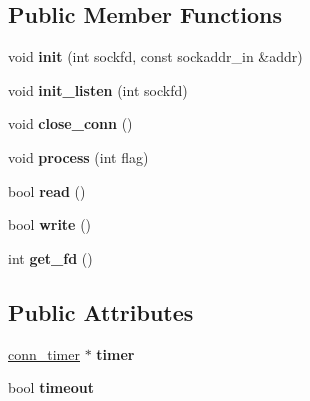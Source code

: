 \subsection*{Public Member Functions}
\begin{DoxyCompactItemize}
\item 
\mbox{\label{classpink__http__conn_abff27697496d209cdc7375f99117f018}} 
void {\bfseries init} (int sockfd, const sockaddr\+\_\+in \&addr)
\item 
\mbox{\label{classpink__http__conn_a14ed30d2643f52ec95c45b11b13b2411}} 
void {\bfseries init\+\_\+listen} (int sockfd)
\item 
\mbox{\label{classpink__http__conn_abdcd7c0da8072d62cb7212523f20298b}} 
void {\bfseries close\+\_\+conn} ()
\item 
\mbox{\label{classpink__http__conn_a41ca12d76d0056562633f27d456d0b62}} 
void {\bfseries process} (int flag)
\item 
\mbox{\label{classpink__http__conn_a254c09e8b962e5a0bc116f8da271b5ed}} 
bool {\bfseries read} ()
\item 
\mbox{\label{classpink__http__conn_a362df085394bbf2818c8af93932c80d5}} 
bool {\bfseries write} ()
\item 
\mbox{\label{classpink__http__conn_aa304899ec9a7f6d7a2a9d738309a9570}} 
int {\bfseries get\+\_\+fd} ()
\end{DoxyCompactItemize}
\subsection*{Public Attributes}
\begin{DoxyCompactItemize}
\item 
\mbox{\label{classpink__http__conn_a0b34c6a8a6b8f65fa882adb109990e43}} 
\hyperlink{classconn__timer}{conn\+\_\+timer} $\ast$ {\bfseries timer}
\item 
\mbox{\label{classpink__http__conn_a8687eb679249e4ae085c319dd2d4dfc7}} 
bool {\bfseries timeout}
\end{DoxyCompactItemize}
